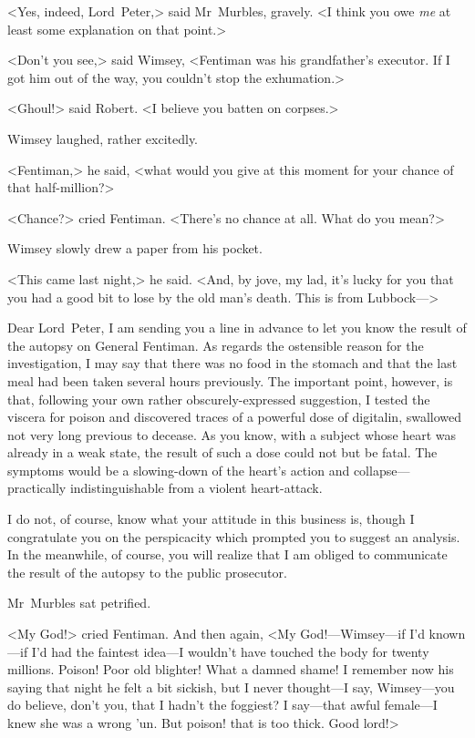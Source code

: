 <Yes, indeed, Lord~Peter,> said Mr~Murbles, gravely. <I think you owe \emph{me} at least some explanation on that point.>

<Don't you see,> said Wimsey, <Fentiman was his grandfather's executor. If I got him out of the way, you couldn't stop the exhumation.>

<Ghoul!> said Robert. <I believe you batten on corpses.>

Wimsey laughed, rather excitedly.

<Fentiman,> he said, <what would you give at this moment for your chance of that half-million?>

<Chance?> cried Fentiman. <There's no chance at all. What do you mean?>

Wimsey slowly drew a paper from his pocket.

<This came last night,> he said. <And, by jove, my lad, it's lucky for you that you had a good bit to lose by the old man's death. This is from Lubbock—>

\begin{mail}{}{Dear Lord~Peter,}
	I am sending you a line in advance to let you know the result of the autopsy on General Fentiman. As regards the ostensible reason for the investigation, I may say that there was no food in the stomach and that the last meal had been taken several hours previously. The important point, however, is that, following your own rather obscurely-expressed suggestion, I tested the viscera for poison and discovered traces of a powerful dose of digitalin, swallowed not very long previous to decease. As you know, with a subject whose heart was already in a weak state, the result of such a dose could not but be fatal. The symptoms would be a slowing-down of the heart's action and collapse—practically indistinguishable from a violent heart-attack.

I do not, of course, know what your attitude in this business is, though I congratulate you on the perspicacity which prompted you to suggest an analysis. In the meanwhile, of course, you will realize that I am obliged to communicate the result of the autopsy to the public prosecutor.
\end{mail}


Mr~Murbles sat petrified.

<My God!> cried Fentiman. And then again, <My God!—Wimsey—if I'd known—if I'd had the faintest idea—I wouldn't have touched the body for twenty millions. Poison! Poor old blighter! What a damned shame! I remember now his saying that night he felt a bit sickish, but I never thought—I say, Wimsey—you do believe, don't you, that I hadn't the foggiest? I say—that awful female—I knew she was a wrong 'un. But poison! that is too thick. Good lord!>

